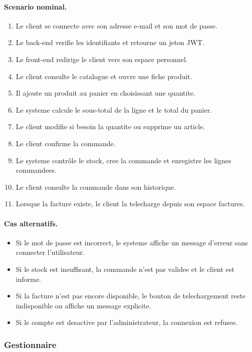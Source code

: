 \paragraph{Scenario nominal.}
\begin{enumerate}
  \item Le client se connecte avec son adresse e-mail et son mot de passe.
  \item Le back-end verifie les identifiants et retourne un jeton JWT.
  \item Le front-end redirige le client vers son espace personnel.
  \item Le client consulte le catalogue et ouvre une fiche produit.
  \item Il ajoute un produit au panier en choisissant une quantite.
  \item Le systeme calcule le sous-total de la ligne et le total du panier.
  \item Le client modifie si besoin la quantite ou supprime un article.
  \item Le client confirme la commande.
  \item Le systeme contrôle le stock, cree la commande et enregistre les lignes commandees.
  \item Le client consulte la commande dans son historique.
  \item Lorsque la facture existe, le client la telecharge depuis son espace factures.
\end{enumerate}

\paragraph{Cas alternatifs.}
\begin{itemize}
  \item Si le mot de passe est incorrect, le systeme affiche un message d'erreur sans connecter l'utilisateur.
  \item Si le stock est insuffisant, la commande n'est pas validee et le client est informe.
  \item Si la facture n'est pas encore disponible, le bouton de telechargement reste indisponible ou affiche un message explicite.
  \item Si le compte est desactive par l'administrateur, la connexion est refusee.
\end{itemize}

\subsubsection{Gestionnaire}

